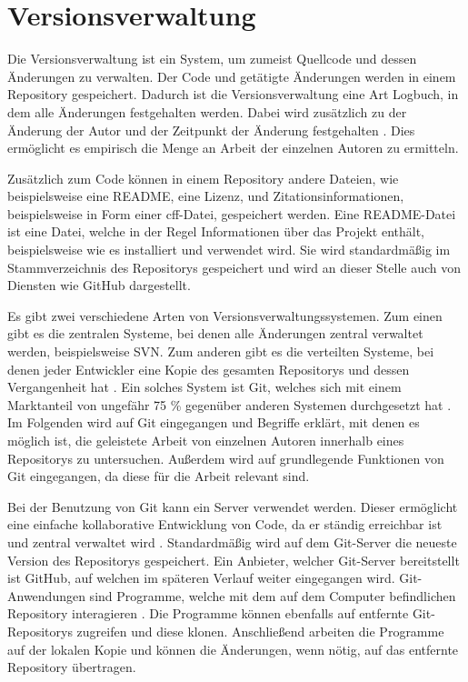 \section{Versionsverwaltung}
\label{sec:versionsverwaltung}
Die Versionsverwaltung ist ein System, um zumeist Quellcode und dessen Änderungen zu verwalten.
Der Code und getätigte Änderungen werden in einem Repository gespeichert.
Dadurch ist die Versionsverwaltung eine Art Logbuch, in dem alle Änderungen festgehalten werden.
Dabei wird zusätzlich zu der Änderung der Autor und der Zeitpunkt der Änderung festgehalten \autocite{ponuthorai_version_2022}.
Dies ermöglicht es empirisch die Menge an Arbeit der einzelnen Autoren zu ermitteln.

Zusätzlich zum Code können in einem Repository andere Dateien, wie beispielsweise eine README, eine Lizenz, und Zitationsinformationen, beispielsweise in Form einer \gls{cff}-Datei, gespeichert werden.
Eine README-Datei ist eine Datei, welche in der Regel Informationen über das Projekt enthält, beispielsweise wie es installiert und verwendet wird.
Sie wird standardmäßig im Stammverzeichnis des Repositorys gespeichert und wird an dieser Stelle auch von Diensten wie GitHub dargestellt.

Es gibt zwei verschiedene Arten von Versionsverwaltungssystemen.
Zum einen gibt es die zentralen Systeme, bei denen alle Änderungen zentral verwaltet werden, beispielsweise SVN.
Zum anderen gibt es die verteilten Systeme, bei denen jeder Entwickler eine Kopie des gesamten Repositorys und dessen Vergangenheit hat \autocite{ponuthorai_version_2022}.
Ein solches System ist Git, welches sich mit einem Marktanteil von ungefähr 75 \% gegenüber anderen Systemen durchgesetzt hat \autocite{lindner_version_2024}.
Im Folgenden wird auf Git eingegangen und Begriffe erklärt, mit denen es möglich ist, die geleistete Arbeit von einzelnen Autoren innerhalb eines Repositorys zu untersuchen.
Außerdem wird auf grundlegende Funktionen von Git eingegangen, da diese für die Arbeit relevant sind.

Bei der Benutzung von Git kann ein Server verwendet werden.
Dieser ermöglicht eine einfache kollaborative Entwicklung von Code, da er ständig erreichbar ist und zentral verwaltet wird \autocite{ponuthorai_version_2022}.
Standardmäßig wird auf dem Git-Server die neueste Version des Repositorys gespeichert.
Ein Anbieter, welcher Git-Server bereitstellt ist GitHub, auf welchen im späteren Verlauf weiter eingegangen wird.
Git-Anwendungen sind Programme, welche mit dem auf dem Computer befindlichen Repository interagieren \autocite{ponuthorai_version_2022}.
Die Programme können ebenfalls auf entfernte Git-Repositorys zugreifen und diese klonen.
Anschließend arbeiten die Programme auf der lokalen Kopie und können die Änderungen, wenn nötig, auf das entfernte Repository übertragen.


